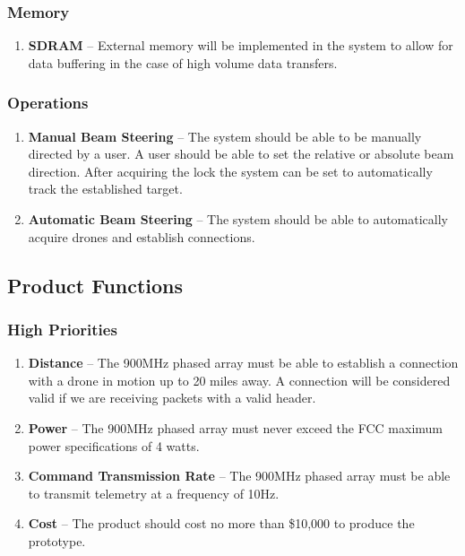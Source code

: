 \documentclass[ProductRequirements.tex]{subfiles}
\begin{document}
		\subsubsection{Memory}
			\begin{enumerate}\itemsep1pt
				\item \textbf{SDRAM} -- External memory will be implemented in the system to allow for data buffering in the case of high volume data transfers.  
			\end{enumerate}
		
		\subsubsection{Operations}
			\begin{enumerate}\itemsep1pt
				\item \textbf{Manual Beam Steering} -- The system should be able to be manually directed by a user.  A user should be able to set the relative or absolute beam direction.  After acquiring the lock the system can be set to automatically track the established target.
				\item \textbf{Automatic Beam Steering} -- The system should be able to automatically acquire drones and establish connections.
			\end{enumerate}
		
	\subsection{Product Functions}
	
		\subsubsection{High Priorities}
			\begin{enumerate}
				\item \textbf{Distance} -- The 900MHz phased array must be able to establish a connection with a drone in motion up to 20 miles away. A connection will be considered valid if we are receiving packets with a valid header.
				\item \textbf{Power} -- The 900MHz phased array must never exceed the FCC maximum power specifications of 4 watts.
				\item \textbf{Command Transmission Rate} -- The 900MHz phased array must be able to transmit telemetry at a frequency of 10Hz.
				\item \textbf{Cost} -- The product should cost no more than \$10,000 to produce the prototype.
							
			\end{enumerate}
		
\end{document}
